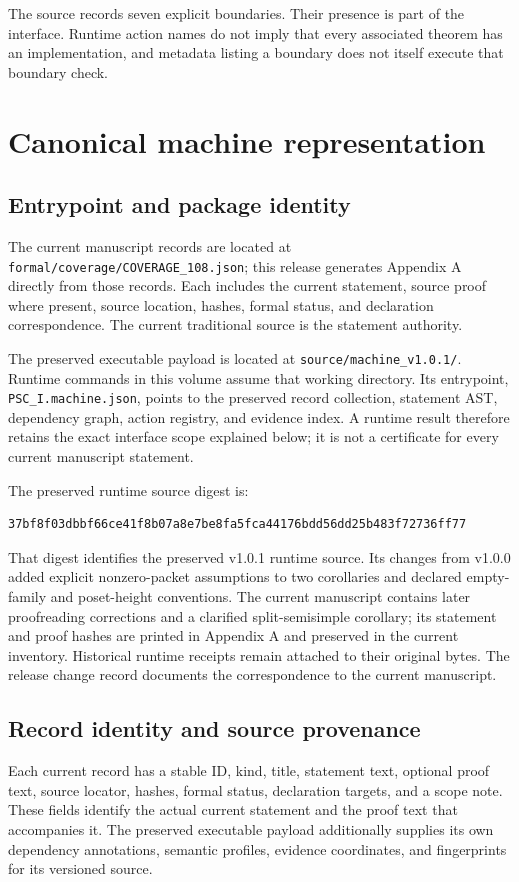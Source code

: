 \documentclass[a4paper,11pt]{article}
\begin{document}
The source records seven explicit boundaries. Their presence is part of the interface. Runtime action names do not imply that every associated theorem has an implementation, and metadata listing a boundary does not itself execute that boundary check.

\section{Canonical machine representation}
\subsection{Entrypoint and package identity}
The current manuscript records are located at \nolinkurl{formal/coverage/COVERAGE_108.json}; this release generates Appendix A directly from those records. Each includes the current statement, source proof where present, source location, hashes, formal status, and declaration correspondence. The current traditional source is the statement authority.

The preserved executable payload is located at \nolinkurl{source/machine_v1.0.1/}. Runtime commands in this volume assume that working directory. Its entrypoint, \nolinkurl{PSC_I.machine.json}, points to the preserved record collection, statement AST, dependency graph, action registry, and evidence index. A runtime result therefore retains the exact interface scope explained below; it is not a certificate for every current manuscript statement.

The preserved runtime source digest is:
\begin{lstlisting}
37bf8f03dbbf66ce41f8b07a8e7be8fa5fca44176bdd56dd25b483f72736ff77
\end{lstlisting}
That digest identifies the preserved v1.0.1 runtime source. Its changes from v1.0.0 added explicit nonzero-packet assumptions to two corollaries and declared empty-family and poset-height conventions. The current manuscript contains later proofreading corrections and a clarified split-semisimple corollary; its statement and proof hashes are printed in Appendix A and preserved in the current inventory. Historical runtime receipts remain attached to their original bytes. The release change record documents the correspondence to the current manuscript.
\subsection{Record identity and source provenance}
Each current record has a stable ID, kind, title, statement text, optional proof text, source locator, hashes, formal status, declaration targets, and a scope note. These fields identify the actual current statement and the proof text that accompanies it. The preserved executable payload additionally supplies its own dependency annotations, semantic profiles, evidence coordinates, and fingerprints for its versioned source.
\end{document}
